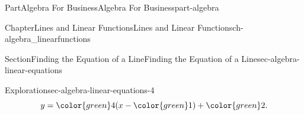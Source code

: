 \documentclass[oneside,10pt,]{tufte-book}
\numberwithin{equation}{chapter}
\begin{document}
\begin{partptx}{Part}{Algebra For Business}{}{Algebra For Business}{}{}{part-algebra}
\begin{chapterptx}{Chapter}{Lines and Linear Functions}{}{Lines and Linear Functions}{}{}{ch-algebra_linearfunctions}
\begin{sectionptx}{Section}{Finding the Equation of a Line}{}{Finding the Equation of a Line}{}{}{sec-algebra-linear-equations}
\begin{exploration}{Exploration}{}{sec-algebra-linear-equations-4}
\begin{equation*}
y = {\color{green} 4 } (x - {\color{green} 1} ) + {\color{green} 2}\text{.}
\end{equation*}
%
\begin{image}{0.25}{0.5}{0.25}{}%
\end{image}
\end{exploration}
\end{sectionptx}
\end{chapterptx}
\end{partptx}
\end{document}
